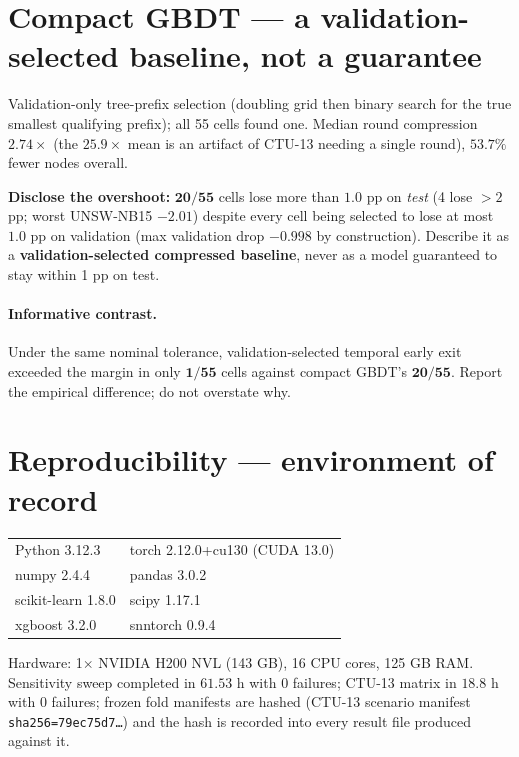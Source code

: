 \section*{Compact GBDT --- a validation-selected baseline, not a guarantee}

Validation-only tree-prefix selection (doubling grid then binary search for the true
smallest qualifying prefix); all 55 cells found one. Median round compression
$\mathbf{2.74\times}$ (the $25.9\times$ mean is an artifact of CTU-13 needing a single
round), $53.7\%$ fewer nodes overall.

\noindent\textbf{Disclose the overshoot:} $\mathbf{20/55}$ cells lose more than $1.0$ pp
on \emph{test} (4 lose $>2$ pp; worst UNSW-NB15 $-2.01$) despite every cell being selected
to lose at most $1.0$ pp on validation (max validation drop $-0.998$ by construction).
Describe it as a \textbf{validation-selected compressed baseline}, never as a model
guaranteed to stay within 1 pp on test.

\paragraph{Informative contrast.} Under the same nominal tolerance, validation-selected
temporal early exit exceeded the margin in only $\mathbf{1/55}$ cells against compact
GBDT's $\mathbf{20/55}$. Report the empirical difference; do not overstate why.

\section*{Reproducibility --- environment of record}

\begin{center}\small
\begin{tabular}{ll}\toprule
Python 3.12.3 & torch 2.12.0+cu130 (CUDA 13.0) \\
numpy 2.4.4 & pandas 3.0.2 \\
scikit-learn 1.8.0 & scipy 1.17.1 \\
xgboost 3.2.0 & snntorch 0.9.4 \\
\bottomrule\end{tabular}\end{center}

\noindent Hardware: 1$\times$ NVIDIA H200 NVL (143 GB), 16 CPU cores, 125 GB RAM.
Sensitivity sweep completed in $61.53$ h with 0 failures; CTU-13 matrix in $18.8$ h with
0 failures; frozen fold manifests are hashed (CTU-13 scenario manifest
\texttt{sha256=79ec75d7\ldots}) and the hash is recorded into every result file produced
against it.

